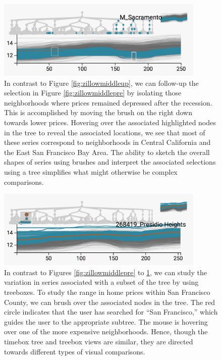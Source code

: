 \begin{figure}

{\centering \includegraphics[width=375px]{figure/treelapse/zillow_middle_down}

}

\caption{In contrast to Figure \ref{fig:zillowmiddleup}, we can follow-up the
  selection in Figure \ref{fig:zillowmiddlepre} by isolating those neighborhoods
  where prices remained depressed after the recession. This is accomplished by
  moving the brush on the right down towards lower prices. Hovering over the
  associated highlighted nodes in the tree to reveal the associated locations,
  we see that most of these series correspond to neighborhoods in Central
  California and the East San Francisco Bay Area. The ability to sketch the
  overall shapes of series using brushes and interpret the associated selections
  using a tree simplifies what might otherwise be complex
  comparisons.}\label{fig:zillowmiddledown}
\end{figure}

\begin{figure}

{\centering \includegraphics[width=375px]{figure/treelapse/zillow_sf}

}

\caption{In contrast to Figures \ref{fig:zillowmiddlepre} to
  \ref{fig:zillowmiddledown}, we can study the variation in series associated
  with a subset of the tree by using treeboxes. To study the range in home
  prices within San Francisco County, we can brush over the associated nodes in
  the tree. The red circle indicates that the user has searched for ``San
  Francisco,'' which guides the user to the appropriate subtree. The mouse is
  hovering over one of the more expensive neighborhoods. Hence, though the
  timebox tree and treebox views are similar, they are directed towards
  different types of visual comparisons.}\label{fig:zillowsf}
\end{figure}

